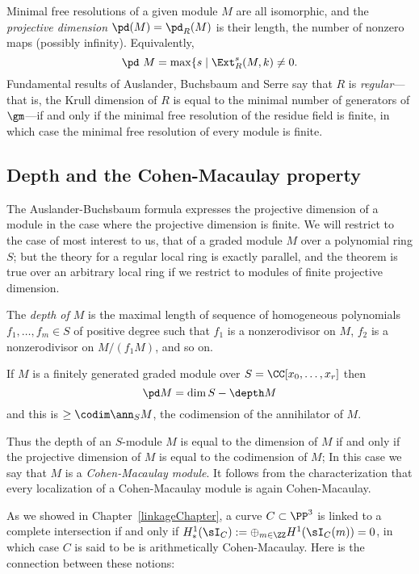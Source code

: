 Minimal free resolutions of a given module $M$ are all isomorphic, and the \emph{projective dimension}  $\pd(M) = \pd_R(M)$ is their length, the number of nonzero
maps (possibly infinity). Equivalently, 
$$
\pd\ M = \max\{s \mid \Ext_R^s(M,k) \neq 0.
$$
Fundamental
results of Auslander, Buchsbaum and Serre say that $R$ is \emph{regular}---that is, the Krull dimension of $R$ is equal to the minimal number
of generators of $\gm$---if and only if the minimal free resolution of the residue field is finite, in which case
the minimal free resolution of every module is finite. 

\subsection{Depth and the Cohen-Macaulay property}
The Auslander-Buchsbaum formula expresses the projective dimension of a module in the case where the projective dimension is finite. We will restrict to the case of most interest to us, that of a graded module $M$ over a polynomial ring $S$; but the
theory for a regular local ring is exactly parallel, and the theorem is true over an arbitrary local ring if we restrict to modules of finite projective dimension.

\begin{definition}
 The \emph{depth of $M$} is the maximal length of sequence of homogeneous polynomials $f_1,\dots,f_m \in S$ of positive degree such that $f_1$ is a nonzerodivisor on $M$, $f_2$ is a nonzerodivisor on $M/(f_1M)$, and so on. 
\end{definition}

\begin{theorem}\label{AB formula}
If $M$ is a finitely generated graded module over $S = \CC[x_0,\dots, x_r]$  then
$$
\pd M = \dim S - \depth M
$$
and this is $\geq \codim \ann_S M$, the codimension of the annihilator of $M$.
\end{theorem}

Thus the depth of an $S$-module $M$ is equal to the dimension of $M$ if and only if the projective dimension
of $M$ is equal to the codimension of $M$; In this case we say that $M$ is a
\emph{Cohen-Macaulay module}. It follows from the characterization that every localization of a Cohen-Macaulay
module is again Cohen-Macaulay.

As we showed in Chapter~\ref{linkageChapter}, a curve $C\subset \PP^3$ is linked to a complete intersection
if and only if  $H^1_*(\sI_C) := \oplus_{m\in \ZZ} H^1(\sI_C(m)) = 0$, in which case $C$ is said to be is arithmetically Cohen-Macaulay. Here is the connection between these notions: 

